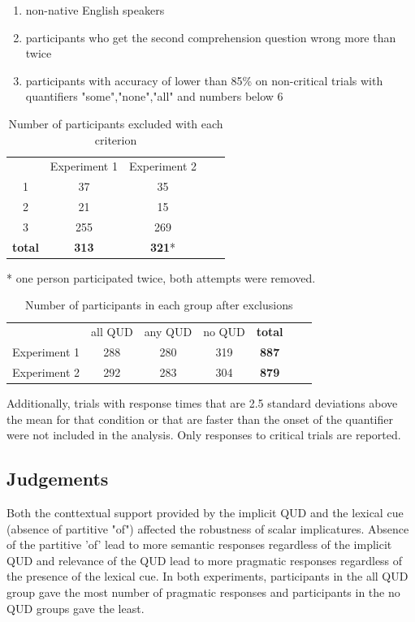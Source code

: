 \documentclass[12pt]{article}
\begin{document}
\begin{enumerate}[noitemsep]
\item non-native English speakers 
\item participants who get the second comprehension question wrong more than twice 
\item participants with accuracy of lower than 85\% on non-critical trials with quantifiers "some","none","all" and numbers below 6
\end{enumerate}

\begin{table}[h]
    \centering
    \caption {Number of participants excluded with each criterion}
    \begin{tabular}{ccccc}
    & Experiment 1 & Experiment 2 \\
    1 & 37 & 35 \\
    2 & 21 & 15 \\
    3 & 255 & 269 \\
    \textbf{total} & \textbf{313} & \textbf{321}* \\
    \end{tabular} 
\end{table}
\vspace{-6mm}
* one person participated twice, both attempts were removed.

\medskip

\begin{table}[h]
    \centering
    \caption {Number of participants in each group after exclusions}
    \begin{tabular}{ccccccc}
    & all QUD & any QUD & no QUD & \textbf{total}\\
    Experiment 1 & 288 & 280 & 319 & \textbf{887}\\
    Experiment 2 & 292 & 283 & 304 & \textbf{879}\\
    \end{tabular}
\end{table}

Additionally, trials with response times that are 2.5 standard deviations above the mean for that condition or that are faster than the onset of the quantifier were not included in the analysis. Only responses to critical trials are reported. 


\subsection*{Judgements}
Both the conttextual support provided by the implicit QUD and the lexical cue (absence of partitive "of") affected the robustness of scalar implicatures. Absence of the partitive 'of' lead to more semantic responses regardless of the implicit QUD and relevance of the QUD lead to more pragmatic responses regardless of the presence of the lexical cue. In both experiments, participants in the all QUD group gave the most number of pragmatic responses and participants in the no QUD groups gave the least.
\end{document}
